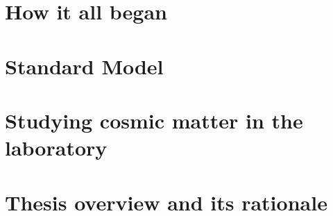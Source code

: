 \section{How it all began}
\section{Standard Model}
\section{Studying cosmic matter in the laboratory}

\section{Thesis overview and its rationale}
